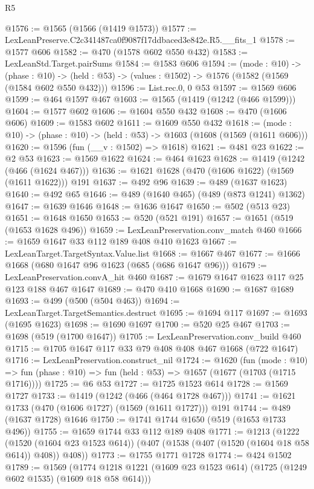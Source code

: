 \begin{lexlean}{R5}
\begin{coremodule}
@1576 := @1565 (@1566 (@1419 @1573))
@1577 := LexLeanPreserve.C2c341487ca0f9087f17ddbaced3e842e.R5.__fits_1
@1578 := @1577 @606
@1582 := @470 (@1578 @602 @550 @432)
@1583 := LexLeanStd.Target.pairSums
@1584 := @1583 @606
@1594 := (mode : @10) ->
  (phase : @10) -> (held : @53) -> (values : @1502) -> @1576 (@1582 (@1569 (@1584 @602 @550 @432)))
@1596 := List.rec.{0, 0} @53
@1597 := @1569 @606
@1599 := @464 @1597 @467
@1603 := @1565 (@1419 (@1242 (@466 @1599)))
@1604 := @1577 @602
@1606 := @1604 @550 @432
@1608 := @470 (@1606 @606)
@1609 := @1583 @602
@1611 := @1609 @550 @432
@1618 := (mode : @10) -> (phase : @10) -> (held : @53) -> @1603 (@1608 (@1569 (@1611 @606)))
@1620 := @1596 (fun (__v : @1502) => @1618)
@1621 := @481 @23
@1622 := @2 @53
@1623 := @1569 @1622
@1624 := @464 @1623
@1628 := @1419 (@1242 (@466 (@1624 @467)))
@1636 := @1621 @1628 (@470 (@1606 @1622) (@1569 (@1611 @1622))) @191
@1637 := @492 @96
@1639 := @489 (@1637 @1623)
@1640 := @492 @65
@1646 := @489 (@1640 @465) (@489 (@873 @1241) @1362)
@1647 := @1639 @1646
@1648 := @1636 @1647
@1650 := @502 (@513 @23)
@1651 := @1648 @1650
@1653 := @520 (@521 @191)
@1657 := @1651 (@519 (@1653 @1628 @496))
@1659 := LexLeanPreservation.conv_match @460
@1666 := @1659 @1647 @33 @112 @189 @408 @410 @1623
@1667 := LexLeanTarget.TargetSyntax.Value.list
@1668 := @1667 @467
@1677 := @1666 @1668 (@680 @1647 @96 @1623 (@685 (@686 @1647 @96)))
@1679 := LexLeanPreservation.convA_hit @460
@1687 := @1679 @1647 @1623 @117 @25 @123 @188 @467 @1647
@1689 := @470 @410 @1668
@1690 := @1687 @1689
@1693 := @499 (@500 (@504 @463))
@1694 := LexLeanTarget.TargetSemantics.destruct
@1695 := @1694 @117
@1697 := @1693 (@1695 @1623)
@1698 := @1690 @1697
@1700 := @520 @25 @467
@1703 := @1698 (@519 (@1700 @1647))
@1705 := LexLeanPreservation.conv_build @460
@1715 := @1705 @1647 @117 @33 @79 @408 @408 @467 @1668 (@722 @1647)
@1716 := LexLeanPreservation.construct_nil
@1724 := @1620
    (fun (mode : @10) =>
    fun (phase : @10) => fun (held : @53) => @1657 (@1677 (@1703 (@1715 @1716))))
@1725 := @6 @53
@1727 := @1725 @1523 @614
@1728 := @1569 @1727
@1733 := @1419 (@1242 (@466 (@464 @1728 @467)))
@1741 := @1621 @1733 (@470 (@1606 @1727) (@1569 (@1611 @1727))) @191
@1744 := @489 (@1637 @1728) @1646
@1750 := @1741 @1744 @1650 (@519 (@1653 @1733 @496))
@1755 := @1659 @1744 @33 @112 @189 @408
@1771 := @1213
    (@1222
      (@1520 (@1604 @23 @1523 @614))
      (@407 (@1538 (@407 (@1520 (@1604 @18 @58 @614)) @408)) @408))
@1773 := @1755 @1771 @1728
@1774 := @424 @1502
@1789 := @1569
    (@1774 @1218 @1221 (@1609 @23 @1523 @614) (@1725 (@1249 @602 @1535) (@1609 @18 @58 @614)))

\end{coremodule}
\end{lexlean}
